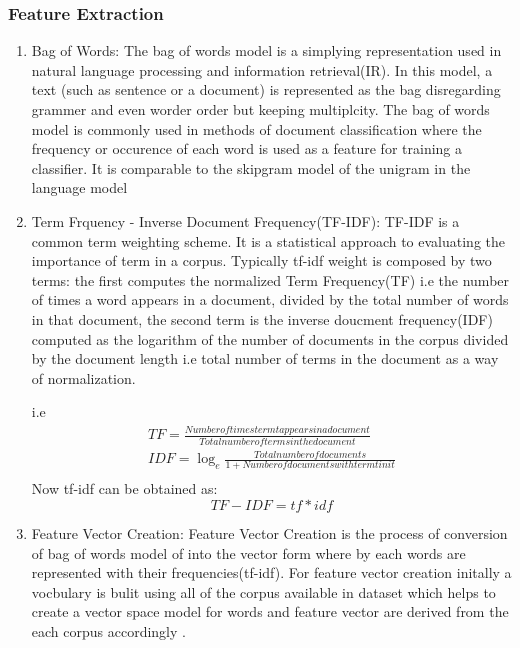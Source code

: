 \subsubsection{Feature Extraction}
\begin{enumerate}
\item Bag of Words:
 The bag of words model is a simplying representation used in natural language processing and information retrieval(IR). In this model, a text (such as sentence or a document) is represented as the bag disregarding grammer and even worder order but keeping multiplcity. The bag of words model is commonly used in methods of document classification where the frequency or occurence of each word is used as a feature for training a classifier. It is comparable to the skipgram model of the unigram in the language model \cite{vector}

\item Term Frquency - Inverse Document Frequency(TF-IDF):
TF-IDF \cite{tfidf} is a common term weighting scheme. It is a statistical approach to evaluating the importance of term in a corpus. Typically tf-idf weight is composed by two terms: the first computes the normalized Term Frequency(TF) i.e the number of times a word appears in a document, divided by the total number of words in that document, the second term is the inverse doucment frequency(IDF) computed as the logarithm of the number of documents in the corpus divided by the document length i.e total number of terms in the document as a way of normalization.

i.e
\begin{equation}
\begin{split}
	TF = \frac{Number of times term t appears in a document}{Total number of terms in the document} \\ 
	IDF = \log_e\frac{Total number of documents}{1+Number of documents with term t in it} \\ 
\end{split}
\end{equation}
Now tf-idf can be obtained as:
\begin{equation}
	TF-IDF = tf * idf
\end{equation}
\item Feature Vector Creation: 
 Feature Vector Creation is the process of conversion of bag of words model of into the vector form where by each words are represented with their frequencies(tf-idf). For feature vector creation initally a vocbulary is bulit using all of the corpus available in dataset which helps to create a vector space model for words and feature vector are derived from the each corpus accordingly \cite{vector}.
\end{enumerate}

